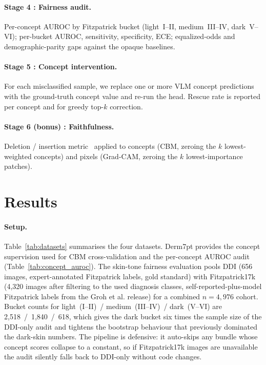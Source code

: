 \documentclass[sigconf,nonacm,screen]{acmart}
\begin{document}
\paragraph{Stage 4 : Fairness audit.}
Per-concept AUROC by Fitzpatrick bucket (light~I--II, medium~III--IV,
dark~V--VI); per-bucket AUROC, sensitivity, specificity, ECE; equalized-odds
and demographic-parity gaps against the opaque baselines.

\paragraph{Stage 5 : Concept intervention.}
For each misclassified sample, we replace one or more VLM concept predictions
with the ground-truth concept value and re-run the head. Rescue rate is
reported per concept and for greedy top-$k$ correction.

\paragraph{Stage 6 (bonus) : Faithfulness.}
Deletion / insertion metric~\cite{petsiuk2018rise} applied to concepts (CBM,
zeroing the $k$ lowest-weighted concepts) and pixels (Grad-CAM, zeroing the
$k$ lowest-importance patches).

\section{Results}

\paragraph{Setup.}
Table~\ref{tab:datasets} summarises the four datasets. Derm7pt provides the
concept supervision used for CBM cross-validation and the per-concept AUROC
audit (Table~\ref{tab:concept_auroc}). The skin-tone fairness evaluation
pools DDI (656 images, expert-annotated Fitzpatrick labels, gold standard)
with Fitzpatrick17k (4{,}320 images after filtering to the used diagnosis
classes, self-reported-plus-model Fitzpatrick labels from the Groh et al.
release) for a combined $n{=}4{,}976$ cohort. Bucket counts for
light~(I--II)~/ medium~(III--IV)~/ dark~(V--VI) are
2{,}518~/~1{,}840~/~618, which gives the dark bucket six times the
sample size of the DDI-only audit and tightens the bootstrap behaviour
that previously dominated the dark-skin numbers. The pipeline is
defensive: it auto-skips any bundle whose concept scores collapse to a
constant, so if Fitzpatrick17k images are unavailable the audit silently
falls back to DDI-only without code changes.
\end{document}
